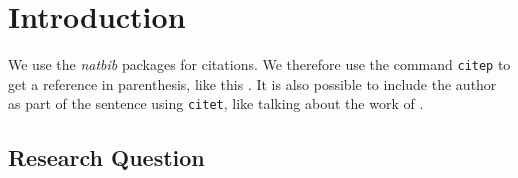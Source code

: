 
\chapter{Introduction}

We use the \emph{natbib} packages for citations.  We therefore use the
command \texttt{citep} to get a reference in parenthesis, like this
\parencite{heisenberg2015}.  It is also possible to include the author as part
of the sentence using \texttt{citet}, like talking about the work of
\textcite{einstein2016}.

\lipsum

\section{Research Question}

\lipsum[6]
